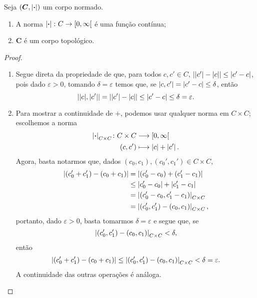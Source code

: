 \begin{proposition}
Seja $(\bm C,\left\vert{\bm{\cdot}}\right\vert)$ um corpo normado.
	\begin{enumerate}
	\item A norma $\left\vert{\bm{\cdot}}\right\vert\colon C \to \left[{0},{\infty}\right[$ é uma função contínua;
	\item $\bm C$ é um corpo topológico.
	\end{enumerate}
\end{proposition}
\begin{proof}
	\begin{enumerate}
	\item Segue direta da propriedade de que, para todos $c,c' \in C$, $\left\vert{\left\vert{c'}\right\vert-\left\vert{c}\right\vert}\right\vert \leq \left\vert{c'-c}\right\vert$, pois dado $\varepsilon > 0$, tomando $\delta=\varepsilon$ temos que, se $\left\vert{c},{c'}\right\vert = \left\vert{c'-c}\right\vert \leq \delta$, então
		\begin{equation*}
		\left\vert{\left\vert{c}\right\vert},{\left\vert{c'}\right\vert}\right\vert = \left\vert{\left\vert{c'}\right\vert-\left\vert{c}\right\vert}\right\vert \leq \left\vert{c'-c}\right\vert \leq \delta = \varepsilon.
		\end{equation*}
	
	\item Para mostrar a continuidade de $+$, podemos usar qualquer norma em $C \times C$; escolhemos a norma
		\begin{align*}
		{\left\vert{\bm{\cdot}}\right\vert_{C \times C}}\colon {C \times C} &\longrightarrow {\left[{0},{\infty}\right[} \\{(c,c')} &\longmapsto \left\vert{c}\right\vert+\left\vert{c'}\right\vert.
		\end{align*}
Agora, basta notarmos que, dados $(c_0,c_1),(c_0',c_1') \in C \times C$,
	\begin{align*}
	\left\vert{(c_0'+c_1') - (c_0+c_1)}\right\vert &= \left\vert{(c_0' - c_0) + (c_1'-c_1)}\right\vert \\
		&\leq \left\vert{c_0'-c_0}\right\vert + \left\vert{c_1'-c_1}\right\vert \\
		&= \left\vert{(c_0'-c_0,c_1'-c_1)}\right\vert_{C \times C} \\
		&= \left\vert{(c_0',c_1')-(c_0,c_1)}\right\vert_{C \times C},
	\end{align*}
portanto, dado $\varepsilon>0$, basta tomarmos $\delta=\varepsilon$ e segue que, se
	\begin{equation*}
		\left\vert{(c_0',c_1')-(c_0,c_1)}\right\vert_{C \times C} < \delta,
	\end{equation*}
então
	\begin{equation*}
	\left\vert{(c_0'+c_1') - (c_0+c_1)}\right\vert \leq \left\vert{(c_0',c_1')-(c_0,c_1)}\right\vert_{C \times C} < \delta=\varepsilon.
	\end{equation*}
A continuidade das outras operações é análoga.
	\end{enumerate}
\end{proof}

